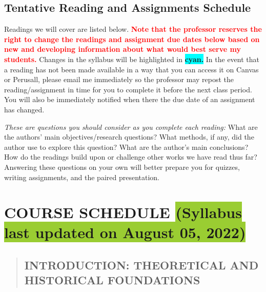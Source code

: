 \documentclass[11pt,]{article}
\begin{document}
\hypertarget{tentative-reading-and-assignments-schedule}{%
\subsection{Tentative Reading and Assignments
Schedule}\label{tentative-reading-and-assignments-schedule}}

Readings we will cover are listed below.
\textcolor{red}{\bf{Note that the professor reserves the right to change the readings and assignment due dates below based on new and developing information about what would best serve my students.}}
Changes in the syllabus will be highlighted in
\colorbox{Cyan}{\bf{cyan.}} In the event that a reading has not been
made available in a way that you can access it on Canvas or Perusall,
please email me immediately so the professor may repost the
reading/assignment in time for you to complete it before the next class
period. You will also be immediately notified when there the due date of
an assignment has changed.

\emph{These are questions you should consider as you complete each
reading:} What are the authors' main objectives/research questions? What
methods, if any, did the author use to explore this question? What are
the author's main conclusions? How do the readings build upon or
challenge other works we have read thus far? Answering these questions
on your own will better prepare you for quizzes, writing assignments,
and the paired presentation.

\hypertarget{course-schedule}{%
\section{\texorpdfstring{COURSE SCHEDULE
\textbf{\colorbox{YellowGreen}{(Syllabus last updated on August 05, 2022) }}}{COURSE SCHEDULE }}\label{course-schedule}}

\vspace{\baselineskip}

\begin{quote}
\hypertarget{introduction-theoretical-and-historical-foundations}{%
\subsection{INTRODUCTION: THEORETICAL AND HISTORICAL
FOUNDATIONS}\label{introduction-theoretical-and-historical-foundations}}
\end{quote}

\bigbreak
\end{document}
